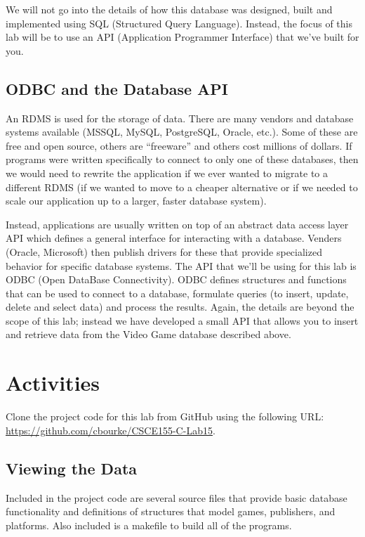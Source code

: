 \documentclass[12pt]{scrartcl}
\begin{document}
We will not go into the details of how this database was designed, 
built and implemented using SQL (Structured Query Language).  
Instead, the focus of this lab will be to use an API (Application 
Programmer Interface) that we've built for you.

\subsection*{ODBC and the Database API}

An RDMS is used for the storage of data.  There are many vendors 
and database systems available (MSSQL, MySQL, PostgreSQL, 
Oracle, etc.).  Some of these are free and open source, others are 
``freeware'' and others cost millions of dollars.  If programs were 
written specifically to connect to only one of these databases, then 
we would need to rewrite the application if we ever wanted to 
migrate to a different RDMS (if we wanted to move to a cheaper 
alternative or if we needed to scale our application up to a larger, 
faster database system).  

Instead, applications are usually written on top of an abstract data 
access layer API which defines a general interface for interacting 
with a database.  Venders (Oracle, Microsoft) then publish drivers 
for these that provide specialized behavior for specific database 
systems.  The API that we'll be using for this lab is ODBC (Open 
DataBase Connectivity).  ODBC defines structures and functions 
that can be used to connect to a database, formulate queries (to 
insert, update, delete and select data) and process the results.  
Again, the details are beyond the scope of this lab; instead we 
have developed a small API that allows you to insert and retrieve 
data from the Video Game database described above.  

\section{Activities}

Clone the project code for this lab from GitHub using the following
URL: \url{https://github.com/cbourke/CSCE155-C-Lab15}.

\subsection{Viewing the Data}

Included in the project code are several source files that provide basic 
database functionality and definitions of structures that model games, 
publishers, and platforms.  Also included is a makefile to build all of the 
programs. 
\end{document}
